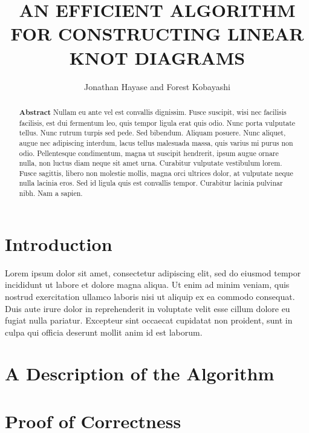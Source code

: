 \documentclass{fkpaper}
\title{AN EFFICIENT ALGORITHM FOR CONSTRUCTING LINEAR KNOT DIAGRAMS}
\author{Jonathan Hayase and Forest Kobayashi}
\affiliation{Department of Mathematics, Harvey Mudd College,
  Claremont, CA, 91711}
\begin{document}



\begin{abstract}
  \textbf{Abstract} Nullam eu ante vel est convallis dignissim. Fusce
  suscipit, wisi nec facilisis facilisis, est dui fermentum leo, quis
  tempor ligula erat quis odio. Nunc porta vulputate tellus. Nunc
  rutrum turpis sed pede. Sed bibendum. Aliquam posuere. Nunc aliquet,
  augue nec adipiscing interdum, lacus tellus malesuada massa, quis
  varius mi purus non odio. Pellentesque condimentum, magna ut
  suscipit hendrerit, ipsum augue ornare nulla, non luctus diam neque
  sit amet urna. Curabitur vulputate vestibulum lorem. Fusce sagittis,
  libero non molestie mollis, magna orci ultrices dolor, at vulputate
  neque nulla lacinia eros. Sed id ligula quis est convallis tempor.
  Curabitur lacinia pulvinar nibh. Nam a sapien.
\end{abstract}


\begin{multicols}{2}
  \section{Introduction}
  Lorem ipsum dolor sit amet, consectetur adipiscing elit, sed do
  eiusmod tempor incididunt ut labore et dolore magna aliqua. Ut enim
  ad minim veniam, quis nostrud exercitation ullamco laboris nisi ut
  aliquip ex ea commodo consequat. Duis aute irure dolor in
  reprehenderit in voluptate velit esse cillum dolore eu fugiat nulla
  pariatur. Excepteur sint occaecat cupidatat non proident, sunt in
  culpa qui officia deserunt mollit anim id est laborum.


  \section{A Description of the Algorithm}

  \section{Proof of Correctness}

\end{multicols}




\nocite{*}
\end{document}
